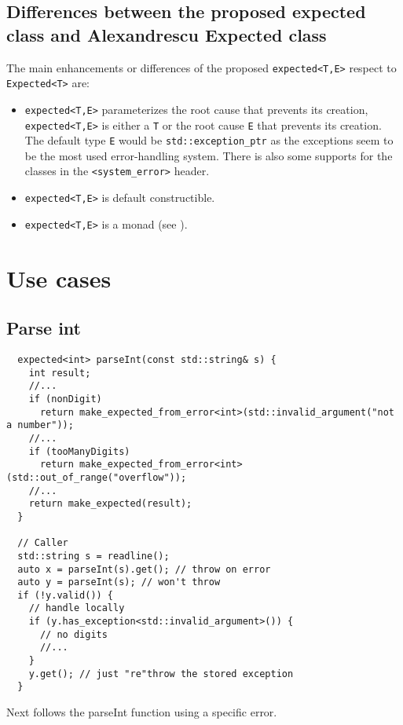 \documentclass[a4paper,10pt]{article}
\newcommand{\cpp}[1]{\lstinline{#1}}
\begin{document}
\subsection{Differences between the proposed expected class and Alexandrescu Expected class}

The main enhancements or differences of the proposed \cpp{expected<T,E>} respect to \cpp{Expected<T>} are:
\begin{itemize}
 \item \cpp{expected<T,E>} parameterizes the root cause that prevents its creation, \cpp{expected<T,E>} is either a \cpp{T} or the root cause \cpp{E} that prevents its creation. The default type \cpp{E} would be \cpp{std::exception_ptr} as the exceptions seem to be the most used error-handling system. There is also some supports for the classes in the \cpp{<system_error>} header.
 \item \cpp{expected<T,E>} is default constructible.
 \item \cpp{expected<T,E>} is a monad (see \cite{MONAD}).
\end{itemize}

\section{Use cases}

\subsection{Parse int}

\begin{lstlisting}
  expected<int> parseInt(const std::string& s) {
    int result;
    //...
    if (nonDigit)  
      return make_expected_from_error<int>(std::invalid_argument("not a number"));
    //...
    if (tooManyDigits) 
      return make_expected_from_error<int>(std::out_of_range("overflow"));
    //...
    return make_expected(result);
  }

  // Caller
  std::string s = readline();
  auto x = parseInt(s).get(); // throw on error
  auto y = parseInt(s); // won't throw
  if (!y.valid()) {
    // handle locally
    if (y.has_exception<std::invalid_argument>()) {
      // no digits
      //...
    }
    y.get(); // just "re"throw the stored exception
  }
\end{lstlisting}

Next follows the parseInt function using a specific error.
\end{document}
